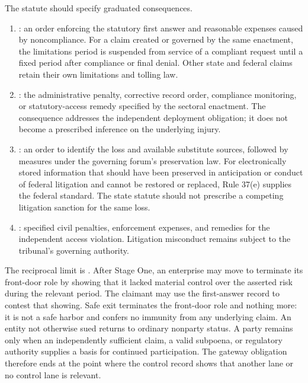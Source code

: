 The statute should specify graduated consequences.

\begin{enumerate}[leftmargin=2.2em]
\item {}: an order enforcing the statutory first answer and reasonable expenses caused by noncompliance. For a claim created or governed by the same enactment, the limitations period is suspended from service of a compliant request until a fixed period after compliance or final denial. Other state and federal claims retain their own limitations and tolling law.
\item {}: the administrative penalty, corrective record order, compliance monitoring, or statutory-access remedy specified by the sectoral enactment. The consequence addresses the independent deployment obligation; it does not become a prescribed inference on the underlying injury.
\item {}: an order to identify the loss and available substitute sources, followed by measures under the governing forum's preservation law. For electronically stored information that should have been preserved in anticipation or conduct of federal litigation and cannot be restored or replaced, Rule 37(e) supplies the federal standard. The state statute should not prescribe a competing litigation sanction for the same loss.
\item {}: specified civil penalties, enforcement expenses, and remedies for the independent access violation. Litigation misconduct remains subject to the tribunal's governing authority.
\end{enumerate}

The reciprocal limit is . After Stage One, an enterprise may move to terminate its front-door role by showing that it lacked material control over the asserted risk during the relevant period. The claimant may use the first-answer record to contest that showing. Safe exit terminates the front-door role and nothing more: it is not a safe harbor and confers no immunity from any underlying claim. An entity not otherwise sued returns to ordinary nonparty status. A party remains only when an independently sufficient claim, a valid subpoena, or regulatory authority supplies a basis for continued participation. The gateway obligation therefore ends at the point where the control record shows that another lane or no control lane is relevant.


